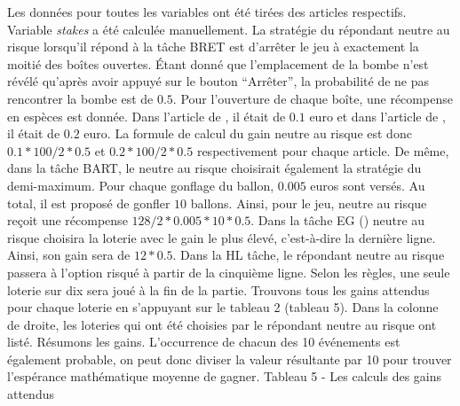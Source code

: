 \documentclass[12pt]{article}
\begin{document}
Les données pour toutes les variables ont été tirées des articles
respectifs. Variable \emph{stakes} a été calculée manuellement. La
stratégie du répondant neutre au risque lorsqu'il répond à la tâche BRET
est d'arrêter le jeu à exactement la moitié des boîtes ouvertes. Étant
donné que l'emplacement de la bombe n'est révélé qu'après avoir appuyé
sur le bouton ``Arrêter'', la probabilité de ne pas rencontrer la bombe
est de \(0.5\). Pour l'ouverture de chaque boîte, une récompense en
espèces est donnée. Dans l'article de \citet{Crosetto2013}, il était de
\(0.1\) euro et dans l'article de \citet{Crosetto2016}, il était de
\(0.2\) euro. La formule de calcul du gain neutre au risque est donc
\(0.1 * 100 / 2 * 0.5\) et \(0.2 * 100 / 2 * 0.5\) respectivement pour
chaque article. De même, dans la tâche BART, le neutre au risque
choisirait également la stratégie du demi-maximum. Pour chaque gonflage
du ballon, \(0.005\) euros sont versés. Au total, il est proposé de
gonfler \(10\) ballons. Ainsi, pour le jeu, neutre au risque reçoit une
récompense \(128 / 2 * 0.005 * 10 * 0.5\). Dans la tâche EG
(\citet{Crosetto2016}) neutre au risque choisira la loterie avec le gain
le plus élevé, c'est-à-dire la dernière ligne. Ainsi, son gain sera de
\(12 * 0.5\). Dans la HL tâche, le répondant neutre au risque passera à
l'option risqué à partir de la cinquième ligne. Selon les règles, une
seule loterie sur dix sera joué à la fin de la partie. Trouvons tous les
gains attendus pour chaque loterie en s'appuyant sur le tableau 2
(tableau 5). Dans la colonne de droite, les loteries qui ont été
choisies par le répondant neutre au risque ont listé. Résumons les
gains. L'occurrence de chacun des 10 événements est également probable,
on peut donc diviser la valeur résultante par 10 pour trouver
l'espérance mathématique moyenne de gagner. Tableau 5 - Les calculs des
gains attendus
\end{document}
